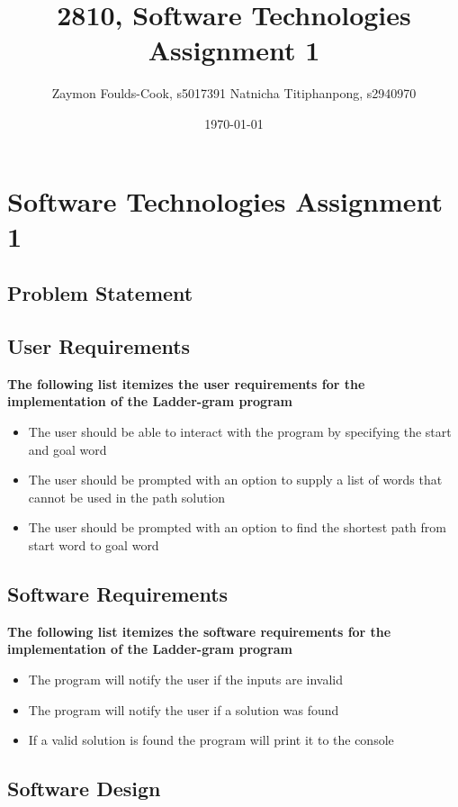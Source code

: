 \documentclass[12pt, a4]{report}
\title{2810, Software Technologies Assignment 1}
\author{Zaymon Foulds-Cook, s5017391 \textbar{} Natnicha Titiphanpong, s2940970}%
\date{\today}
\begin{document}
\begin{titlepage}
	\maketitle
\end{titlepage}
 \tableofcontents
\pagebreak
\section{Software Technologies Assignment 1}
\subsection{Problem Statement}
	\par
	
\subsection{User Requirements}
	\textbf{The following list itemizes the user requirements for the implementation of the Ladder-gram program}
	\begin{itemize}
		\item The user should be able to interact with the program by specifying the start and goal word
		\item The user should be prompted with an option to supply a list of words that cannot be used in the path solution
		\item The user should be prompted with an option to find the shortest path from start word to goal word
	\end{itemize}
	
\subsection{Software Requirements}
	\textbf{The following list itemizes the software requirements for the implementation of the Ladder-gram program}
	\begin{itemize}
		\item The program will notify the user if the inputs are invalid
		\item The program will notify the user if a solution was found
		\item If a valid solution is found the program will print it to the console
	\end{itemize}
	\pagebreak
	
\subsection{Software Design}
\end{document}
